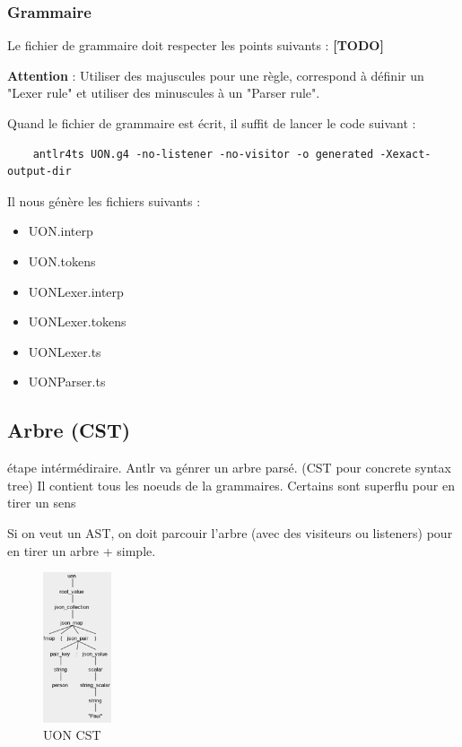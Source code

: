 \documentclass[
    iict, %
    il, %
]{heig-tb}
\begin{document}
\subsubsection{Grammaire}
Le fichier de grammaire doit respecter les points suivants : \textbf{[TODO]}

\textbf{Attention} : Utiliser des majuscules pour une règle, correspond à définir un "Lexer rule" et utiliser des minuscules à un  "Parser rule".

Quand le fichier de grammaire est écrit, il suffit de lancer le code suivant :

\begin{lstlisting}
    antlr4ts UON.g4 -no-listener -no-visitor -o generated -Xexact-output-dir
\end{lstlisting}

Il nous génère les fichiers suivants :
\begin{itemize}
    \item UON.interp
    \item UON.tokens
    \item UONLexer.interp
    \item UONLexer.tokens
    \item UONLexer.ts
    \item UONParser.ts
\end{itemize}

\subsection{Arbre (CST)}
étape intérmédiraire.
Antlr va génrer un arbre parsé. (CST pour concrete syntax tree)
Il contient tous les noeuds de la grammaires. Certains sont superflu pour en tirer un sens

Si on veut un AST, on doit parcouir l'arbre (avec des visiteurs ou listeners) pour en tirer un arbre + simple.


\begin{figure}[!ht]
    \begin{center}
        \includegraphics[width=2cm]{assets/figures/tree.png}
    \end{center}
    \caption[UON CST]{\label{uon-tree} UON CST}
\end{figure}
\end{document}

